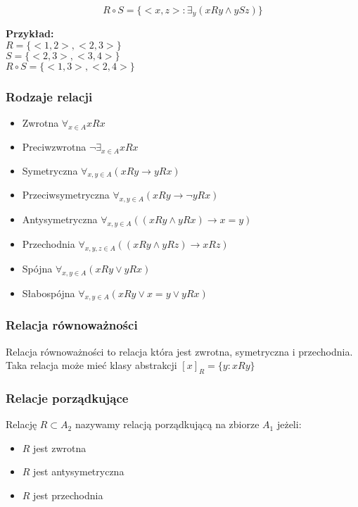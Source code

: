 \documentclass{../notatki}
\begin{document}
$$
R \circ S = \{<x, z>: \exists_{y}(xRy \land ySz)\}
$$

\textbf{Przykład:} \\
$R = \{<1, 2>, <2, 3>\}$ \\
$S = \{<2, 3>, <3, 4>\}$ \\
$R \circ S = \{<1, 3>, <2, 4>\}$

\subsubsection{Rodzaje relacji}

\begin{itemize}
  \item Zwrotna $\forall_{x \in A}xRx$
  \item Preciwzwrotna $\neg \exists_{x \in A}xRx$
  \item Symetryczna $\forall_{x, y \in A}(xRy \rightarrow yRx)$
  \item Przeciwsymetryczna $\forall_{x, y \in A}(xRy \rightarrow \neg yRx)$
  \item Antysymetryczna $\forall_{x, y \in A}((xRy \land yRx)
    \rightarrow x = y)$
  \item Przechodnia $\forall_{x, y, z \in A}((xRy \land yRz) \rightarrow xRz)$
  \item Spójna $\forall_{x, y \in A}(xRy \lor yRx)$
  \item Słabospójna $\forall_{x, y \in A}(xRy \lor x = y \lor yRx)$
\end{itemize}

\subsubsection{Relacja równoważności}

Relacja równoważności to relacja która jest zwrotna, symetryczna i przechodnia.
Taka relacja może mieć klasy abstrakcji $[x]_R=\{y : xRy\}$

\subsubsection{Relacje porządkujące}

Relację $R \subset A_2$ nazywamy relacją porządkującą na zbiorze $A_1$ jeżeli:

\begin{itemize}
  \item $R$ jest zwrotna
  \item $R$ jest antysymetryczna
  \item $R$ jest przechodnia
\end{itemize}
\end{document}
